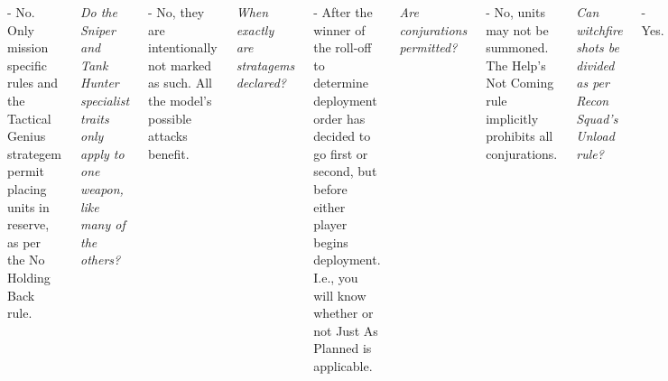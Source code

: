 \documentclass{40k}
\begin{document}
\begin{columns}
- No.  Only mission specific rules and the Tactical Genius strategem
permit placing units in reserve, as per the No Holding Back rule.

\smallskip\noindent\emph{Do the Sniper and Tank Hunter specialist
  traits only apply to one weapon, like many of the others?}

- No, they are intentionally not marked as such.  All the model's
possible attacks benefit.

\smallskip\noindent\emph{When exactly are stratagems declared?}

- After the winner of the roll-off to determine deployment order has
decided to go first or second, but before either player begins
deployment.  I.e., you will know whether or not Just As Planned is
applicable.

%

\smallskip\noindent\emph{Are conjurations permitted?}

- No, units may not be summoned.  The Help's Not Coming rule
implicitly prohibits all conjurations.

\smallskip\noindent\emph{Can witchfire shots be divided as per Recon Squad's Unload rule?}

- Yes.

%

\smallskip\noindent\emph{How do Necron Reanimation Protocols and
  Resurrection Orbs work here?}

- Following the Codex Specific Adaptations for Necrons, casualties are
marked directly rather than putting a counter on their unit since the
latter doesn't exist in Recon Squad due to the Army Of One rule.
Reanimation Protocol rolls may be made for those marked casualties
within~3'' of a friendly Necron model not also marked as a casualty.
On success the model stands back up with~1 wound remaining and the
counter is removed.  On failure both model and counter are removed.

Applying the Recon Squad Side Effects rule, if the marked model was
part of a unit selection in the original army list with a Resurrection
Orb, its Reanimation Roll passes on a~4+ instead of a~5+ if the
Resurrection Orb is within~3'' of the marked casualty.

  \smallskip\noindent\emph{Is line of sight or movement blocked by
    Necron models killed but marked with counters to potentially
    reanimate instead of removing?}

  - No.  If enemy models move within~1'' of the marked model simply
  move it and its counter the shortest distance to keept it 1'' away
  from all enemy models and not in impassible terrain.



\end{columns}
\end{document}
